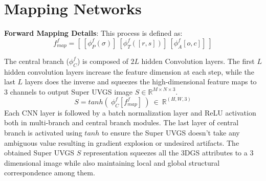 


\section{Mapping Networks}

\noindent\textbf{Forward Mapping Details}:
This process is defined as:
\begin{equation}
   f^f_{map} = [ ~[\phi^f_{P}(\sigma)] ~[\phi^f_{T}([r,s])] ~[\phi^f_{A}[o,c]] ~] 
\end{equation}
   
The central branch ($\phi^f_{C}$) is composed of $2L$ hidden Convolution layers.
The first $L$ hidden convolution layers increase the feature dimension at each step, while the last $L$ layers does the inverse and squeezes the high-dimensional feature maps to 3 channels to output Super UVGS image $S \in \mathbb{R}^{M\times N \times 3}$. 
\begin{equation}
    S = tanh(~\phi^f_{C}[f^f_{map}]~) ~\in~\mathbb{R}^{(H,W,3)}
\end{equation}
Each CNN layer is followed by a batch normalization layer and ReLU activation both in multi-branch and central branch modules. 
The last layer of central branch is activated using $tanh$ to ensure the Super UVGS doesn't take any ambiguous value resulting in gradient explosion or undesired artifacts. 
The obtained Super UVGS $S$ representation squeezes all the 3DGS attributes to a 3 dimensional image while also maintaining local and global structural correspondence among them. 




